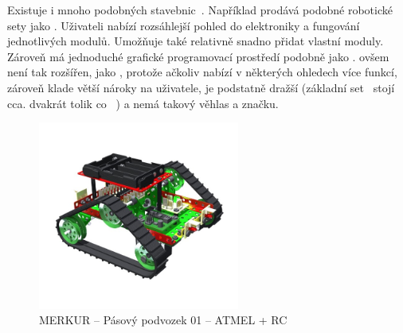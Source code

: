 
Existuje i mnoho podobných stavebnic~\cite{intorobotics_BestAlternativesToLegoMindstormsKits}. 
Například \fischerT prodává podobné robotické sety jako \lego{~}\cite{fischertechnik_ROBOTICS}. 
Uživateli nabízí rozsáhlejší pohled do elektroniky a fungování jednotlivých modulů. 
Umožňuje také relativně snadno přidat vlastní moduly.
Zároveň má jednoduché grafické programovací prostředí podobně jako \lego. 
\FischerT{ }ovšem není tak rozšířen, jako \legoM, protože ačkoliv nabízí v některých ohledech více funkcí, zároveň klade větší nároky na uživatele, je podstatně dražší (základní set~\cite{fischertechnik_HelagoEshop_ROBOTICS-TXT-COMPETITION-SET} stojí cca. dvakrát tolik co ~\cite{lego_eduxeEshop_CoreSet}) a nemá takový věhlas a značku.



\begin{figure}[h]
 	\centering
	\includegraphics[width=250px]{images/MERKUR_Pasovy-podvozek-01_ATMEL+RC.jpg}
		\caption[MERKUR -- Pásový podvozek 01 -- ATMEL + RC]{MERKUR -- Pásový podvozek 01 -- ATMEL + RC\protect\footnotemark}
	\label{fig:MERKUR_Pasovy-podvozek-01_ATMEL+RC}
\end{figure}

